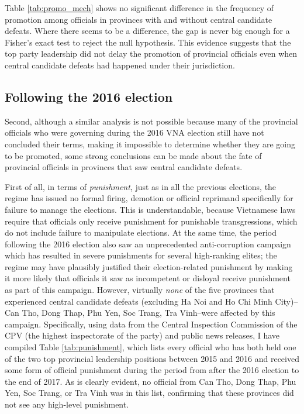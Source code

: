 \documentclass[12pt]{article}
\newcommand{\1}{\mathbbm{1}}
\begin{document}


Table \ref{tab:promo_mech} shows no significant difference in the frequency of promotion among officials in provinces with and without central candidate defeats. Where there seems to be a difference, the gap is never big enough for a Fisher's exact test to reject the null hypothesis. This evidence suggests that the top party leadership did not delay the promotion of provincial officials even when central candidate defeats had happened under their jurisdiction.

\subsection{Following the 2016 election}

Second, although a similar analysis is not possible because many of the provincial officials who were governing during the 2016 VNA election still have not concluded their terms, making it impossible to determine whether they are going to be promoted, some strong conclusions can be made about the fate of provincial officials in provinces that saw central candidate defeats.

First of all, in terms of \textit{punishment}, just as in all the previous elections, the regime has issued no formal firing, demotion or official reprimand specifically for failure to manage the elections. This is understandable, because Vietnamese laws require that officials only receive punishment for punishable transgressions, which do not include failure to manipulate elections. At the same time, the period following the 2016 election also saw an unprecedented anti-corruption campaign which has resulted in severe punishments for several high-ranking elites; the regime may have plausibly justified their election-related punishment by making it more likely that officials it saw as incompetent or disloyal receive punishment as part of this campaign. However, virtually \textit{none} of the five provinces that experienced central candidate defeats (excluding Ha Noi and Ho Chi Minh City)--Can Tho, Dong Thap, Phu Yen, Soc Trang, Tra Vinh--were affected by this campaign. Specifically, using data from the Central Inspection Commission of the CPV (the highest inspectorate of the party) and public news releases, I have compiled Table \ref{tab:punishment}, which lists every official who has both held one of the two top provincial leadership positions between 2015 and 2016 and received some form of official punishment during the period from after the 2016 election to the end of 2017. As is clearly evident, no official from Can Tho, Dong Thap, Phu Yen, Soc Trang, or Tra Vinh was in this list, confirming that these provinces did not see any high-level punishment. 
\end{document}
